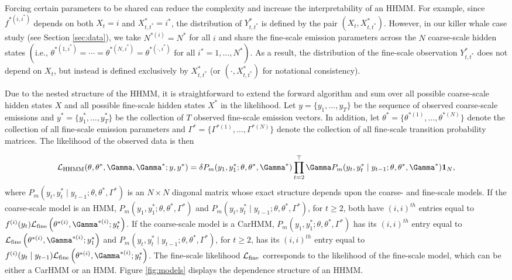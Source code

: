 Forcing certain parameters to be shared can reduce the complexity and increase the interpretability of an HHMM. For example, since $f^{*(i,i^*)}$ depends on both $X_t = i$ and $X^*_{t,t^*} = i^*$, the distribution of $Y^*_{t,t^*}$ is defined by the pair $(X_t,X^*_{t,t^*})$. However, in our killer whale case study (see Section \ref{sec:data}), we take $N^{*(i)} = N^*$ for all $i$ and share the fine-scale emission parameters across the $N$ coarse-scale hidden states $\left( \text{i.e., } \theta^{*(1,i^*)} = \cdots = \theta^{*(N,i^*)} = \theta^{*(\cdot,i^*)} \text{ for all } i^* = 1, \ldots, N^* \right)$. As a result, the distribution of the fine-scale observation $Y^*_{t,t^*}$ does not depend on $X_t$, but instead is defined exclusively by $X^*_{t,t^*}$ (or $(\cdot,X^*_{t,t^*})$ for notational consistency).

Due to the nested structure of the HHMM, it is straightforward to extend the forward algorithm and sum over all possible coarse-scale hidden states $X$ and all possible fine-scale hidden states $X^*$ in the likelihood.
%
Let $y = \{y_1, \ldots,y_T\}$ be the sequence of observed coarse-scale emissions and
$y^* = \{y^*_1, \ldots,y^*_T\}$ be the collection of $T$ observed fine-scale emission vectors.
%
In addition, let $\theta^* = \{\theta^{*(1)}, \ldots, \theta^{*(N)}\}$ denote the collection of all fine-scale emission parameters and $\Gamma^* = \{\Gamma^{*(1)}, \ldots, \Gamma^{*(N)}\}$ denote the collection of all fine-scale transition probability matrices. The likelihood of the observed data is then

\begin{equation}
    \calL_{\text{HHMM}}(\theta,\theta^*,\Gamma,\Gamma^*;y,y^*) = \delta P_m(y_1,y_1^*;\theta,\theta^*,\Gamma^*) \prod_{t=2}^\top \Gamma P_m(y_t,y_t^* \mid y_{t-1};\theta,\theta^*,\Gamma^*) \mathbf{1}_N,
    \label{eqn:HHMM_likelihood}
\end{equation}
%
where $P_m(y_t,y_t^* \mid y_{t-1};\theta,\theta^*,\Gamma^*)$ is an $N \times N$ diagonal matrix whose exact structure depends upon the coarse- and fine-scale models. If the coarse-scale model is an HMM, $P_m(y_1,y_1^*;\theta,\theta^*,\Gamma^*)$ and $P_m(y_t,y_t^* \mid y_{t-1};\theta,\theta^*,\Gamma^*)$, for $t \geq 2$, both have $(i,i)^{th}$ entries equal to 
$f^{(i)}(y_t)\calL_{\text{fine}}\left(\theta^{*(i)},
\Gamma^{*(i)};y_t^*\right)$. 
If the coarse-scale model is a CarHMM, $P_m(y_1,y_1^*;\theta,\theta^*,\Gamma^*)$ has its $(i,i)^{th}$ entry equal to $\calL_{\text{fine}}\left(\theta^{*(i)},
\Gamma^{*(i)};y_1^*\right)$ and $P_m(y_t,y_t^* \mid y_{t-1};\theta,\theta^*,\Gamma^*)$, for $t \geq 2$, has its $(i,i)^{th}$ entry equal to $f^{(i)}(y_t \mid y_{t-1})\calL_{\text{fine}}\left(\theta^{*(i)},
\Gamma^{*(i)};y_t^*\right)$.
The fine-scale likelihood $\mathcal{L}_{\text{fine}}$ corresponds to the likelihood of the fine-scale model, which can be either a CarHMM or an HMM. Figure \ref{fig:models} displays the dependence structure of an HHMM.

